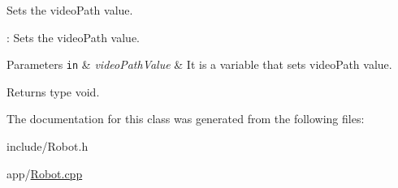 Sets the video\+Path value. 

\+: Sets the video\+Path value.


\begin{DoxyParams}[1]{Parameters}
\mbox{\tt in}  & {\em video\+Path\+Value} & It is a variable that sets video\+Path value. \\
\hline
\end{DoxyParams}
\begin{DoxyReturn}{Returns}
type void. 
\end{DoxyReturn}


The documentation for this class was generated from the following files\+:\begin{DoxyCompactItemize}
\item 
include/Robot.\+h\item 
app/\hyperlink{Robot_8cpp}{Robot.\+cpp}\end{DoxyCompactItemize}
